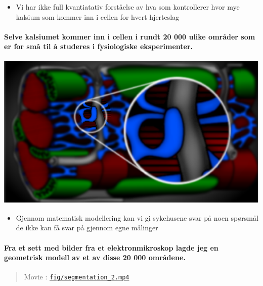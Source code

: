 \documentclass[%
oneside,                 %
final,                   %
10pt,norsk]{article}
\newenvironment{doconce:movie}{}{}
\newcounter{doconce:movie:counter}
\begin{document}
\begin{itemize}
\item Vi har ikke full kvantiatativ forståelse av hva som kontrollerer
  hvor mye kalsium som kommer inn i cellen for hvert hjerteslag
\end{itemize}

\noindent
\paragraph{Selve kalsiumet kommer inn i cellen i rundt 20 000 ulike områder som er for små til å studeres i fysiologiske eksperimenter.}
\centerline{\includegraphics[width=0.9\linewidth]{fig/sarcomere_nice_black_blowup.pdf}}



\begin{itemize}
\item Gjennom matematisk modellering kan vi gi sykehusene svar på noen
  spørsmål de ikke kan få svar på gjennom egne målinger
\end{itemize}

\noindent


\paragraph{Fra et sett med bilder fra et elektronmikroskop lagde jeg en geometrisk modell av et av disse 20 000 områdene.}
\begin{doconce:movie}
\begin{quote}
Movie :  \href{run:fig/segmentation_2.mp4}{\nolinkurl{fig/segmentation_2.mp4}}
\end{quote}
\end{doconce:movie}


\end{document}

